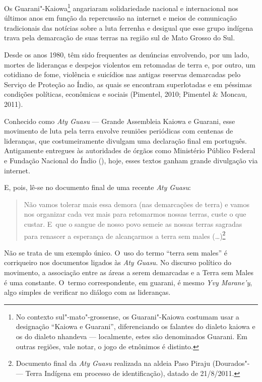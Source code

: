 \noindent
Os Guarani"-Kaiowa\footnote{No contexto sul"-mato"-grossense, os
Guarani"-Kaiowa costumam usar a designação ``Kaiowa e Guarani'',
diferenciando os falantes do dialeto kaiowa e os do dialeto nhandeva ---
localmente, estes são denominados Guarani. Em outras regiões, vale
notar, o jogo de etnônimos é distinto.} angariaram solidariedade
nacional e internacional nos últimos anos em função da repercussão na
internet e meios de comunicação tradicionais das notícias sobre a luta
ferrenha e desigual que esse grupo indígena trava pela demarcação de
suas terras na região sul de Mato Grosso do Sul.

Desde os anos 1980, têm sido frequentes as denúncias envolvendo, por um
lado, mortes de lideranças e despejos violentos em retomadas de terra
e, por outro, um cotidiano de fome, violência e suicídios nas antigas
reservas demarcadas pelo Serviço de Proteção ao Índio, as quais se
encontram superlotadas e em péssimas condições políticas, econômicas e
sociais (Pimentel, 2010; Pimentel \& Moncau, 2011).

Conhecido como \emph{Aty Guasu} --- Grande Assembleia Kaiowa e Guarani, esse
movimento de luta pela terra envolve reuniões periódicas com centenas
de lideranças, que costumeiramente divulgam uma declaração final em
português. Antigamente entregues às autoridades de órgãos como
Ministério Público Federal e Fundação Nacional do Índio (), hoje,
esses textos ganham grande divulgação via internet.

E, pois, lê-se no documento final de uma recente \emph{Aty Guasu}:

\begin{quote}
\noindent
Não vamos tolerar mais essa demora (nas demarcações de terra) e vamos
nos organizar cada vez mais para retomarmos nossas terras, custe o que
custar. E~que o sangue de nosso povo semeie as nossas terras sagradas
para renascer a esperança de alcançarmos a terra sem males
(\ldots{})\footnote{Documento final da \emph{Aty Guasu} realizada na aldeia Paso
Piraju (Dourados"- --- Terra Indígena em processo de identificação),
datado de 21/8/2011.}
\end{quote}

Não se trata de um exemplo único. O~uso do termo ``terra sem males'' é
corriqueiro nos documentos ligados às \emph{Aty Guasu}. No discurso político
do movimento, a associação entre as áreas a serem demarcadas e a Terra
sem Males é uma constante. O~termo correspondente, em guarani, é mesmo
\emph{Yvy Marane’y}, algo simples de verificar no diálogo com as lideranças.

